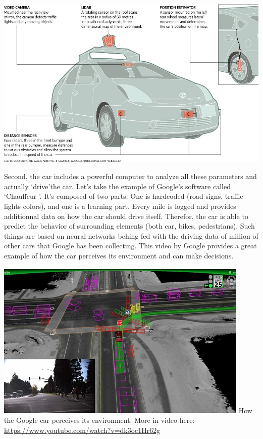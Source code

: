 \documentclass[12pt]{article}
\begin{document}
\smallskip
\includegraphics[width=\textwidth]{car-diagram}
\smallskip

Second, the car includes a powerful computer to analyze all these parameters
and actually \lq drive\rq the car. Let's take the example of Google's software
called \lq Chauffeur \rq . It's composed of two parts. One is hardcoded
(road signs, traffic lights colors), and one is a learning part. Every mile is
logged and provides additionnal data on how the car should drive itself.
Therefor, the car is able to predict the behavior of surrounding elements
(both car, bikes, pedestrians). Such things are based on neural networks behing
fed with the driving data of million of other cars
that Google has been collecting. This video by Google provides a great example
of how the car perceives its environment and can make decisions.

\smallskip
\includegraphics[width=\textwidth]{google-car}
How the Google car perceives its environment. More in video here: \url{https://www.youtube.com/watch?v=dk3oc1Hr62g}
\smallskip
\end{document}
